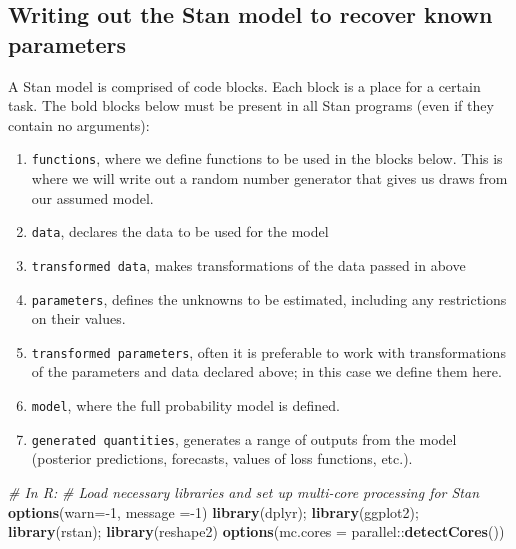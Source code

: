 \documentclass[]{book}
\newenvironment{Shaded}{\begin{snugshade}}{\end{snugshade}}
\newcommand{\KeywordTok}[1]{\textcolor[rgb]{0.13,0.29,0.53}{\textbf{{#1}}}}
\newcommand{\DataTypeTok}[1]{\textcolor[rgb]{0.13,0.29,0.53}{{#1}}}
\newcommand{\DecValTok}[1]{\textcolor[rgb]{0.00,0.00,0.81}{{#1}}}
\newcommand{\CommentTok}[1]{\textcolor[rgb]{0.56,0.35,0.01}{\textit{{#1}}}}
\newcommand{\NormalTok}[1]{{#1}}
\providecommand{\tightlist}{%
  \setlength{\itemsep}{0pt}\setlength{\parskip}{0pt}}
\begin{document}
\subsection{Writing out the Stan model to recover known
parameters}\label{writing-out-the-stan-model-to-recover-known-parameters}

A Stan model is comprised of code blocks. Each block is a place for a
certain task. The bold blocks below must be present in all Stan programs
(even if they contain no arguments):

\begin{enumerate}
\def\labelenumi{\arabic{enumi}.}
\tightlist
\item
  \texttt{functions}, where we define functions to be used in the blocks
  below. This is where we will write out a random number generator that
  gives us draws from our assumed model.
\item
  \texttt{data}, declares the data to be used for the model
\item
  \texttt{transformed\ data}, makes transformations of the data passed
  in above
\item
  \texttt{parameters}, defines the unknowns to be estimated, including
  any restrictions on their values. 
\item
  \texttt{transformed\ parameters}, often it is preferable to work with
  transformations of the parameters and data declared above; in this
  case we define them here.
\item
  \texttt{model}, where the full probability model is defined.
\item
  \texttt{generated\ quantities}, generates a range of outputs from the
  model (posterior predictions, forecasts, values of loss functions,
  etc.).
\end{enumerate}

\begin{Shaded}
\begin{Highlighting}[]
\CommentTok{# In R:}
\CommentTok{# Load necessary libraries and set up multi-core processing for Stan}
\KeywordTok{options}\NormalTok{(}\DataTypeTok{warn=}\NormalTok{-}\DecValTok{1}\NormalTok{, }\DataTypeTok{message =}\NormalTok{-}\DecValTok{1}\NormalTok{)}
\KeywordTok{library}\NormalTok{(dplyr); }\KeywordTok{library}\NormalTok{(ggplot2); }\KeywordTok{library}\NormalTok{(rstan); }\KeywordTok{library}\NormalTok{(reshape2)}
\KeywordTok{options}\NormalTok{(}\DataTypeTok{mc.cores =} \NormalTok{parallel::}\KeywordTok{detectCores}\NormalTok{())}
\end{Highlighting}
\end{Shaded}
\end{document}
